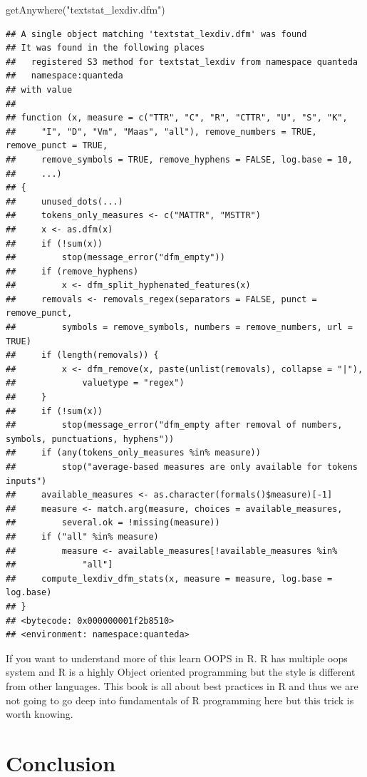\documentclass[
]{book}
\newenvironment{Shaded}{\begin{snugshade}}{\end{snugshade}}
\newcommand{\FunctionTok}[1]{\textcolor[rgb]{0.00,0.00,0.00}{#1}}
\newcommand{\NormalTok}[1]{#1}
\newcommand{\StringTok}[1]{\textcolor[rgb]{0.31,0.60,0.02}{#1}}
\begin{document}
\begin{Shaded}
\begin{Highlighting}[]
\FunctionTok{getAnywhere}\NormalTok{(}\StringTok{"textstat\_lexdiv.dfm"}\NormalTok{)}
\end{Highlighting}
\end{Shaded}

\begin{verbatim}
## A single object matching 'textstat_lexdiv.dfm' was found
## It was found in the following places
##   registered S3 method for textstat_lexdiv from namespace quanteda
##   namespace:quanteda
## with value
## 
## function (x, measure = c("TTR", "C", "R", "CTTR", "U", "S", "K", 
##     "I", "D", "Vm", "Maas", "all"), remove_numbers = TRUE, remove_punct = TRUE, 
##     remove_symbols = TRUE, remove_hyphens = FALSE, log.base = 10, 
##     ...) 
## {
##     unused_dots(...)
##     tokens_only_measures <- c("MATTR", "MSTTR")
##     x <- as.dfm(x)
##     if (!sum(x)) 
##         stop(message_error("dfm_empty"))
##     if (remove_hyphens) 
##         x <- dfm_split_hyphenated_features(x)
##     removals <- removals_regex(separators = FALSE, punct = remove_punct, 
##         symbols = remove_symbols, numbers = remove_numbers, url = TRUE)
##     if (length(removals)) {
##         x <- dfm_remove(x, paste(unlist(removals), collapse = "|"), 
##             valuetype = "regex")
##     }
##     if (!sum(x)) 
##         stop(message_error("dfm_empty after removal of numbers, symbols, punctuations, hyphens"))
##     if (any(tokens_only_measures %in% measure)) 
##         stop("average-based measures are only available for tokens inputs")
##     available_measures <- as.character(formals()$measure)[-1]
##     measure <- match.arg(measure, choices = available_measures, 
##         several.ok = !missing(measure))
##     if ("all" %in% measure) 
##         measure <- available_measures[!available_measures %in% 
##             "all"]
##     compute_lexdiv_dfm_stats(x, measure = measure, log.base = log.base)
## }
## <bytecode: 0x000000001f2b8510>
## <environment: namespace:quanteda>
\end{verbatim}

If you want to understand more of this learn OOPS in R. R has multiple oops system and R is a highly Object oriented programming but the style is different from other languages. This book is all about best practices in R and thus we are not going to go deep into fundamentals of R programming here but this trick is worth knowing.

\hypertarget{conclusion-2}{%
\section{Conclusion}\label{conclusion-2}}
\end{document}

